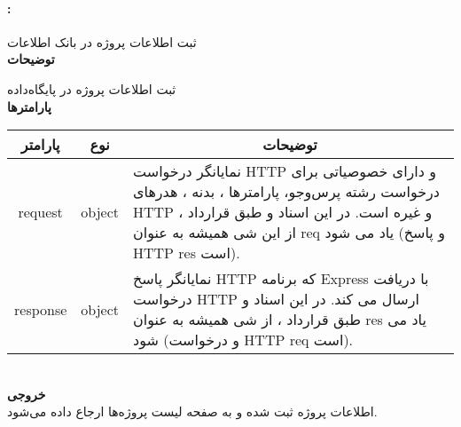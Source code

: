 \paragraph{:}
ثبت اطلاعات پروژه در بانک اطلاعات
\\
\textbf{توضیحات}
\hr
\begin{flushleft}
	\framebox[.9\textwidth][l]{
		\lr{
			\textcolor{type}{void}
			\textcolor{func}{postAddProject}
			\textcolor{symb}{(}
			\textcolor{type}{object}
			\textcolor{arg}{request}
			\textcolor{symb}{,}
			\textcolor{type}{object}
			\textcolor{arg}{response}
			\textcolor{symb}{);}
		}
	}
\end{flushleft}
ثبت اطلاعات پروژه در پایگاه‌داده
\\
\textbf{پارامترها}
\hr \\[10pt]
\begin{tabular}{|m{4cm}|m{3cm}|m{10cm}|}
	\hline
	\multicolumn{1}{|c}{پارامتر}
	&
	\multicolumn{1}{|c}{نوع}
	&
	\multicolumn{1}{|c|}{توضیحات}
	\\
	\hline
	\multicolumn{1}{|c}{request}
	&
	\multicolumn{1}{|c|}{object}
	&
	نمایانگر درخواست HTTP و دارای خصوصیاتی برای درخواست رشته پرس‌و‌جو، پارامترها ، بدنه ، هدرهای HTTP و غیره است.
	در این اسناد و طبق قرارداد ، از این شی همیشه به عنوان req یاد می شود (و پاسخ HTTP res است).
	\\
	\hline
	\multicolumn{1}{|c}{response}
	&
	\multicolumn{1}{|c|}{object}
	&
	نمایانگر پاسخ HTTP که برنامه Express با دریافت درخواست HTTP ارسال می کند.
	در این اسناد و طبق قرارداد ، از شی همیشه به عنوان res یاد می شود (و درخواست HTTP req است).
	\\
	\hline
\end{tabular}
\\[10pt]
\textbf{خروجی}
\hr \\
اطلاعات پروژه ثبت شده و به صفحه لیست پروژه‌ها ارجاع داده می‌شود.

